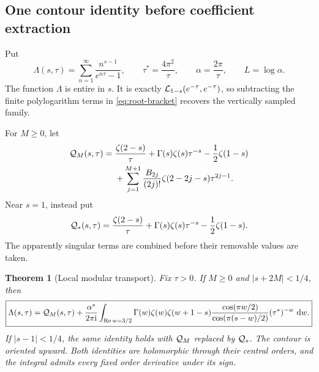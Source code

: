 \documentclass[11pt,letterpaper]{article}
\numberwithin{equation}{section}
\newtheorem{theorem}{Theorem}[section]
\theoremstyle{definition}
\theoremstyle{remark}
\DeclareMathOperator{\Ree}{Re}
\newcommand{\ii}{\mathrm i}
\newcommand{\dd}{\,\mathrm d}
\begin{document}
\subsection{One contour identity before coefficient extraction}

Put
\begin{equation}\label{eq:mod-lambda}
 \Lambda(s,\tau)=\sum_{n=1}^{\infty}
       \frac{n^{s-1}}{e^{n\tau}-1},\qquad
 \tau^*=\frac{4\pi^2}{\tau},\qquad
 \alpha=\frac{2\pi}{\tau},\qquad L=\log\alpha.
\end{equation}
The function \(\Lambda\) is entire in \(s\). It is exactly
\({\cal L}_{1-s}(e^{-\tau},e^{-\tau})\), so subtracting the
finite polylogarithm terms in \eqref{eq:root-bracket} recovers
the vertically sampled family.

For \(M\geq0\), let
\begin{align}
 {\cal Q}_M(s,\tau)
  ={}&\frac{\zeta(2-s)}{\tau}
   +\Gamma(s)\zeta(s)\tau^{-s}-\frac12\zeta(1-s)\notag\\
 &+\sum_{j=1}^{M+1}\frac{B_{2j}}{(2j)!}
          \zeta(2-2j-s)\tau^{2j-1}.
 \label{eq:mod-residue-even}
\end{align}
Near \(s=1\), instead put
\begin{equation}\label{eq:mod-residue-one}
 {\cal Q}_*(s,\tau)=
   \frac{\zeta(2-s)}{\tau}
   +\Gamma(s)\zeta(s)\tau^{-s}-\frac12\zeta(1-s).
\end{equation}
The apparently singular terms are combined before their removable
values are taken.

\begin{theorem}[Local modular transport]\label{thm:modular}
Fix \(\tau>0\). If \(M\geq0\) and \(|s+2M|<1/4\), then
\begin{equation}\label{eq:modular-master}
 \boxed{\displaystyle
 \Lambda(s,\tau)={\cal Q}_M(s,\tau)
  +\frac{\alpha^s}{2\pi\ii}
   \int_{\Ree w=3/2}
       \Gamma(w)\zeta(w)\zeta(w+1-s)
       \frac{\cos(\pi w/2)}{\cos(\pi(s-w)/2)}
       (\tau^*)^{-w}\,\dd w.}
\end{equation}
If \(|s-1|<1/4\), the same identity holds with
\({\cal Q}_M\) replaced by \({\cal Q}_*\).
The contour is oriented upward. Both identities are holomorphic
through their central orders, and the integral admits every fixed
order derivative under its sign.
\end{theorem}
\end{document}
